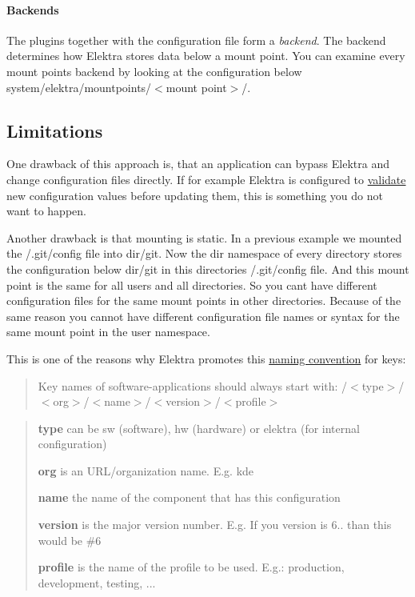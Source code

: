 \paragraph*{Backends}

The plugins together with the configuration file form a {\itshape backend}. The backend determines how Elektra stores data below a mount point. You can examine every mount points backend by looking at the configuration below {\ttfamily system/elektra/mountpoints/$<$mount point$>$/}.

\subsection*{Limitations}

One drawback of this approach is, that an application can bypass Elektra and change configuration files directly. If for example Elektra is configured to \hyperlink{md_doc_tutorials_validation_doc_tutorials_validation_md}{validate} new configuration values before updating them, this is something you do not want to happen.

Another drawback is that mounting is static. In a previous example we mounted the {\ttfamily /.git/config} file into {\ttfamily dir/git}. Now the {\ttfamily dir} namespace of every directory stores the configuration below {\ttfamily dir/git} in this directories {\ttfamily /.git/config} file. And this mount point is the same for all users and all directories. So you can\textquotesingle{}t have different configuration files for the same mount points in other directories. Because of the same reason you cannot have different configuration file names or syntax for the same mount point in the {\ttfamily user} namespace.

This is one of the reasons why Elektra promotes this \hyperlink{doc_help_elektra-key-names_md}{naming convention} for keys\+:

\begin{quote}
Key names of software-\/applications should always start with\+: {\ttfamily /$<$type$>$/$<$org$>$/$<$name$>$/$<$version$>$/$<$profile$>$} \end{quote}


\begin{quote}

\begin{DoxyItemize}
\item {\bfseries type} can be {\ttfamily sw} (software), {\ttfamily hw} (hardware) or {\ttfamily elektra} (for internal configuration)
\item {\bfseries org} is an U\+R\+L/organization name. E.\+g. {\ttfamily kde}
\item {\bfseries name} the name of the component that has this configuration
\item {\bfseries version} is the major version number. E.\+g. If you version is 6.. than this would be {\ttfamily \#6}
\item {\bfseries profile} is the name of the profile to be used. E.\+g.\+: {\ttfamily production}, {\ttfamily development}, {\ttfamily testing}, ... 
\end{DoxyItemize}\end{quote}


